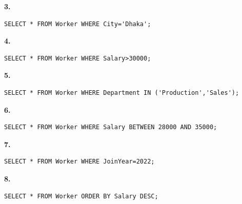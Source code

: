 \begin{chSixSideBySide}[.48]
\par\noindent\begin{minipage}{\linewidth}\textbf{3.}\par
\begin{verbatim}
SELECT * FROM Worker WHERE City='Dhaka';
\end{verbatim}
\end{minipage}\par
\chSixNextColumn
\par\noindent\begin{minipage}{\linewidth}\textbf{4.}\par
\begin{verbatim}
SELECT * FROM Worker WHERE Salary>30000;
\end{verbatim}
\end{minipage}\par
\end{chSixSideBySide}
\begin{chSixSideBySide}[.48]
\par\noindent\begin{minipage}{\linewidth}\textbf{5.}\par
\begin{verbatim}
SELECT * FROM Worker WHERE Department IN ('Production','Sales');
\end{verbatim}
\end{minipage}\par
\chSixNextColumn
\par\noindent\begin{minipage}{\linewidth}\textbf{6.}\par
\begin{verbatim}
SELECT * FROM Worker WHERE Salary BETWEEN 28000 AND 35000;
\end{verbatim}
\end{minipage}\par
\end{chSixSideBySide}
\begin{chSixSideBySide}[.48]
\par\noindent\begin{minipage}{\linewidth}\textbf{7.}\par
\begin{verbatim}
SELECT * FROM Worker WHERE JoinYear=2022;
\end{verbatim}
\end{minipage}\par
\chSixNextColumn
\par\noindent\begin{minipage}{\linewidth}\textbf{8.}\par
\begin{verbatim}
SELECT * FROM Worker ORDER BY Salary DESC;
\end{verbatim}
\end{minipage}\par
\end{chSixSideBySide}

